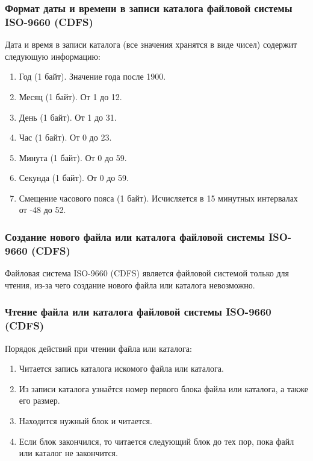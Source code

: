 \subsubsection{Формат даты и времени в записи каталога файловой системы ISO-9660 (CDFS)}

Дата и время в записи каталога (все значения хранятся в виде чисел) содержит следующую информацию:

\begin{enumerate}
\item Год (1 байт). Значение года после 1900.
\item Месяц (1 байт). От 1 до 12.
\item День (1 байт). От 1 до 31.
\item Час (1 байт). От 0 до 23.
\item Минута (1 байт). От 0 до 59.
\item Секунда (1 байт). От 0 до 59.
\item Смещение часового пояса (1 байт). Исчисляется в 15 минутных интервалах от -48 до 52.
\end{enumerate}

\subsubsection{Создание нового файла или каталога файловой системы ISO-9660 (CDFS)}

Файловая система ISO-9660 (CDFS) является файловой системой только для чтения, из-за чего создание нового файла или каталога невозможно.

\subsubsection{Чтение файла или каталога файловой системы ISO-9660 (CDFS)}

Порядок действий при чтении файла или каталога:

\begin{enumerate}
\item Читается запись каталога искомого файла или каталога.
\item Из записи каталога узнаётся номер первого блока файла или каталога, а также его размер.
\item Находится нужный блок и читается.
\item Если блок закончился, то читается следующий блок до тех пор, пока файл или каталог не закончится.
\end{enumerate}

